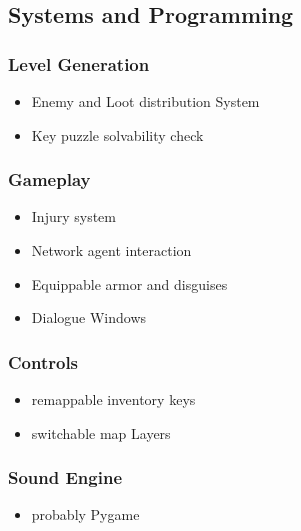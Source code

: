 \documentclass[11pt,a4paper, twocolumn]{article}
\begin{document}
\subsection{Systems and Programming}

\subsubsection{Level Generation}
\begin{itemize}
    \item Enemy and Loot distribution System
    \item Key puzzle solvability check
\end{itemize}

\subsubsection*{Gameplay}
\begin{itemize}
    \item Injury system
    \item Network agent interaction
    \item Equippable armor and disguises
    \item Dialogue Windows
\end{itemize}

\subsubsection*{Controls}
\begin{itemize}
    \item remappable inventory keys
    \item switchable map Layers
\end{itemize}

\subsubsection*{Sound Engine}
\begin{itemize}
    \item probably Pygame
\end{itemize}
\end{document}
